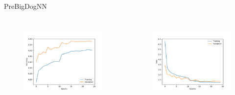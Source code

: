   \begin{frame}{PreBigDogNN}
    \begin{columns}[c]
      \begin{figure}
        \centering
        \includegraphics[width=\textwidth]{logos/PreBigDogNN/history_acc_prebig.pdf}
        \label{fig:acc_prebig}
      \end{figure}
      \begin{figure}
        \centering
        \includegraphics[width=\textwidth]{logos/PreBigDogNN/history_loss_prebig.pdf}
        \label{fig:loss_prebig}
      \end{figure}
    \end{columns}
  \end{frame}

